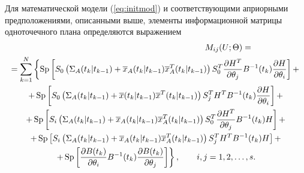 \documentclass[a4paper,14pt]{extarticle}
\DeclareMathOperator{\Sp}{Sp}
\newcommand{\pd}[2]{\frac{\partial #1}{\partial #2}}
\newcommand{\inv}[1]{#1^{-1}}
\begin{document}
\newcommand{\pred}[0]{t_{k}|t_{k-1}}
\newcommand{\est}[0]{t_k|t_k}
\newcommand{\fut}[0]{t_{k+1}}
\newcommand{\upd}[0]{t_{k+1}|t_{k+1}}
\newcommand{\ol}[1]{\overline{#1}}
\newcommand{\Th}[0]{\Theta}

\newcommand{\sumlim}[2]{\sum\limits_{#1}^{#2}}

Для математической модели (\ref{eq:initmod}) и соответствующими априорными
предположениями, описанными выше, элементы информационной матрицы одноточечного
плана определяются выражением
\begin{multline}
	\label{eq:fim}
	\hspace{0.5\textwidth} M_{ij}(U;\Th) =\\
		= \sumlim{k=1}{N} \left\{ \Sp \left[ 
		S_0 \left(\Sigma_A(\pred) + \ol{x}_A(\pred) \ol{x}^T_A(\pred) \right)
		S_0^T \pd{H^T}{\theta_j} \inv{B}(t_k) \pd{H}{\theta_i} \right] + \right. \\
		\left.
		+ \Sp\left[ S_0 \left( \Sigma_A(\pred) + \ol{x}(\pred)
		\ol{x}^T(\pred) \right) S_j^T H^T \inv{B}(t_k) \pd{H}{\theta_i}
		\right] + \right. \\ \left.
		+ \Sp\left[ S_i \left( \Sigma_A(\pred) + \ol{x}_A(\pred) \ol{x}^T_A(\pred)
		\right) S_0^T \pd{H^T}{\theta_j} \inv{B}(t_k) H \right] + \right. \\ \left.
		+ \Sp \left[ S_i \left( \Sigma_A(\pred) + \ol{x}_A(\pred) \ol{x}^T_A(\pred)
		\right) S_j^T H^T \inv{B}(t_k) H \right] + \right. \\ \left.
		+ \Sp \left[ \pd{B(t_k)}{\theta_i} \inv{B}(t_k) \pd{B(t_k)}{\theta_j} 
		\right]  \right\},\qquad i,j = 1,2,\ldots,s.
\end{multline}
\end{document}
